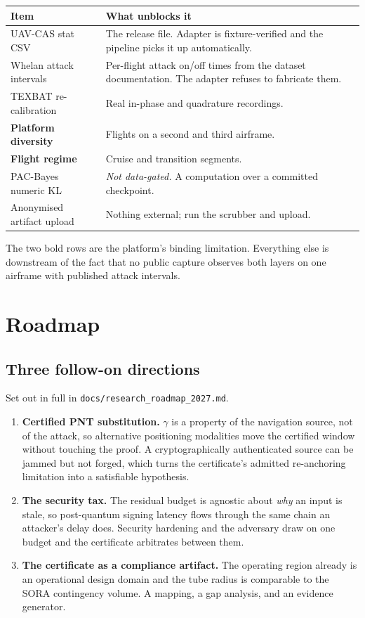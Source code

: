 \documentclass[11pt,a4paper]{article}
\newcommand{\code}[1]{\texttt{#1}}
\begin{document}
\begin{table}[H]
\centering\small
\begin{tabularx}{\linewidth}{@{}p{4.4cm}X@{}}
\toprule
\textbf{Item} & \textbf{What unblocks it} \\
\midrule
UAV-CAS stat CSV & The release file. Adapter is fixture-verified and the pipeline picks it up automatically. \\
Whelan attack intervals & Per-flight attack on/off times from the dataset documentation. The adapter refuses to fabricate them. \\
TEXBAT re-calibration & Real in-phase and quadrature recordings. \\
\textbf{Platform diversity} & Flights on a second and third airframe. \\
\textbf{Flight regime} & Cruise and transition segments. \\
PAC-Bayes numeric KL & \emph{Not data-gated.} A computation over a committed checkpoint. \\
Anonymised artifact upload & Nothing external; run the scrubber and upload. \\
\bottomrule
\end{tabularx}
\end{table}

The two bold rows are the platform's binding limitation. Everything else is
downstream of the fact that no public capture observes both layers on one
airframe with published attack intervals.

\section{Roadmap}

\subsection{Three follow-on directions}
Set out in full in \code{docs/research\_roadmap\_2027.md}.

\begin{enumerate}[leftmargin=1.6em]
\item \textbf{Certified PNT substitution.} $\gamma$ is a property of the
navigation source, not of the attack, so alternative positioning modalities move
the certified window without touching the proof. A cryptographically
authenticated source can be jammed but not forged, which turns the certificate's
admitted re-anchoring limitation into a satisfiable hypothesis.
\item \textbf{The security tax.} The residual budget is agnostic about
\emph{why} an input is stale, so post-quantum signing latency flows through the
same chain an attacker's delay does. Security hardening and the adversary draw
on one budget and the certificate arbitrates between them.
\item \textbf{The certificate as a compliance artifact.} The operating region
already is an operational design domain and the tube radius is comparable to the
SORA contingency volume. A mapping, a gap analysis, and an evidence generator.
\end{enumerate}
\end{document}

